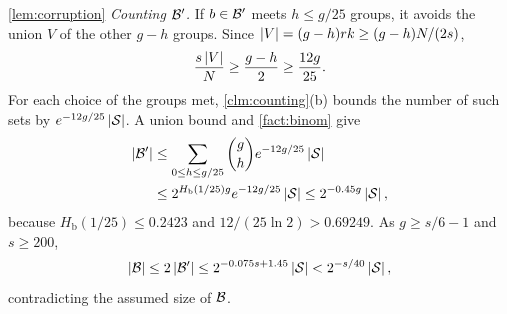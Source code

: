 \begin{proofof}{\cref{lem:corruption}}
\emph{Counting $\mathcal{B}'$.} If $b\in\mathcal{B}'$ meets $h\le g/25$ groups, it avoids the union $V$ of the other $g-h$ groups. Since $\left|V\right|=(g-h)rk\ge(g-h)N/(2s)$,
\[
\frac{s\left|V\right|}{N}\ge\frac{g-h}{2}\ge\frac{12g}{25}.
\]
For each choice of the groups met, \cref{clm:counting}(b) bounds the number of such sets by $e^{-12g/25}\left|\mathcal{S}\right|$. A union bound and \cref{fact:binom} give
\begin{align*}
\left|\mathcal{B}'\right|
&\le \sum_{0\le h\le g/25}\binom gh e^{-12g/25}\left|\mathcal{S}\right|\\
&\le 2^{H_{\mathrm b}(1/25)g}e^{-12g/25}\left|\mathcal{S}\right|
\le2^{-0.45g}\left|\mathcal{S}\right|,
\end{align*}
because $H_{\mathrm b}(1/25)\le0.2423$ and $12/(25\ln2)>0.69249$. As $g\ge s/6-1$ and $s\ge200$,
\[
\left|\mathcal{B}\right|\le2\left|\mathcal{B}'\right|\le2^{-0.075s+1.45}\left|\mathcal{S}\right|
<2^{-s/40}\left|\mathcal{S}\right|,
\]
contradicting the assumed size of $\mathcal{B}$.
\end{proofof}
